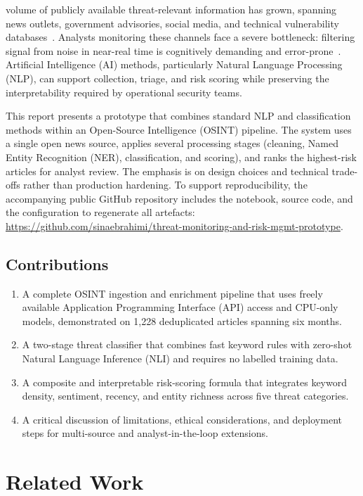 \documentclass[12pt,lettersize,journal,onecolumn]{IEEEtran}
\begin{document}
 volume of publicly available threat-relevant information has grown, spanning news outlets, government advisories, social media, and technical vulnerability databases~\cite{comst23sun,Yadav2023}. Analysts monitoring these channels face a severe bottleneck: filtering signal from noise in near-real time is cognitively demanding and error-prone~\cite{zhu2018threat}. Artificial Intelligence (AI) methods, particularly Natural Language Processing (NLP), can support collection, triage, and risk scoring while preserving the interpretability required by operational security teams.

This report presents a prototype that combines standard NLP and classification methods within an Open-Source Intelligence (OSINT) pipeline. The system uses a single open news source, applies several processing stages (cleaning, Named Entity Recognition (NER), classification, and scoring), and ranks the highest-risk articles for analyst review. The emphasis is on design choices and technical trade-offs rather than production hardening. To support reproducibility, the accompanying public GitHub repository includes the notebook, source code, and the configuration to regenerate all artefacts: \url{https://github.com/sinaebrahimi/threat-monitoring-and-risk-mgmt-prototype}.

\subsection{Contributions}
\begin{enumerate}[leftmargin=*,noitemsep]
  \item A complete OSINT ingestion and enrichment pipeline that uses freely available Application Programming Interface (API) access and CPU-only models, demonstrated on 1,228 deduplicated articles spanning six months. %
  \item A two-stage threat classifier that combines fast keyword rules with zero-shot Natural Language Inference (NLI) and requires no labelled training data.
  \item A composite and interpretable risk-scoring formula that integrates keyword density, sentiment, recency, and entity richness across five threat categories.
  \item A critical discussion of limitations, ethical considerations, and deployment steps for multi-source and analyst-in-the-loop extensions.
\end{enumerate}

% 
\section{Related Work}
\label{sec:related}
% 
\end{document}
